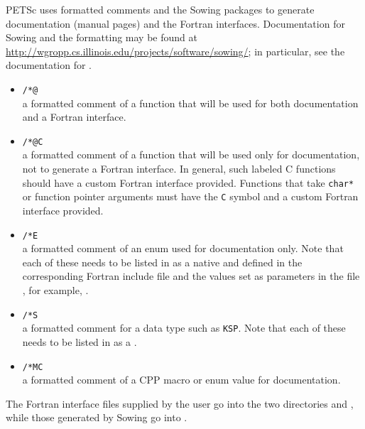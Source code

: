 PETSc uses formatted comments and the Sowing packages \cite{gropp1993sowing,gropp1993sowing2} to generate documentation (manual pages) and the Fortran interfaces.
Documentation for Sowing and the formatting may be found at \href{http://wgropp.cs.illinois.edu/projects/software/sowing/}{http://wgropp.cs.illinois.edu/projects/software/sowing/}; in particular, see the documentation for .

\begin{itemize}
    \item
      \lstinline{/*@}\\      a formatted comment of a function that will be used for
        both documentation and a Fortran interface.
    \item
      \lstinline{/*@C}\\    a formatted comment of a function that will be used only for
        documentation, not to generate a Fortran interface. In general, such labeled C functions should have a custom Fortran interface provided. Functions that take \lstinline{char*} or function pointer arguments must have the \lstinline{C} symbol and a custom Fortran interface provided.
    \item
      \lstinline{/*E}\\     a formatted comment of an enum used for documentation only. Note that
        each of these needs to be listed in  as
        a native and defined in the corresponding
         Fortran include file and the values
        set as parameters in the file , for example, .
    \item
      \lstinline{/*S}\\     a formatted comment for a data type such as \lstinline{KSP}. Note that each of these
        needs to be listed in  as a .
    \item
      \lstinline{/*MC}\\    a formatted comment of a CPP macro or enum value for documentation.
\end{itemize}

The Fortran interface files supplied by the user go into the two directories   and , while those generated by Sowing go into .

